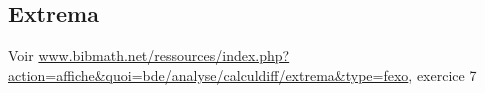 \subsection{Extrema}

Voir \url{www.bibmath.net/ressources/index.php?action=affiche&quoi=bde/analyse/calculdiff/extrema&type=fexo}, exercice 7

